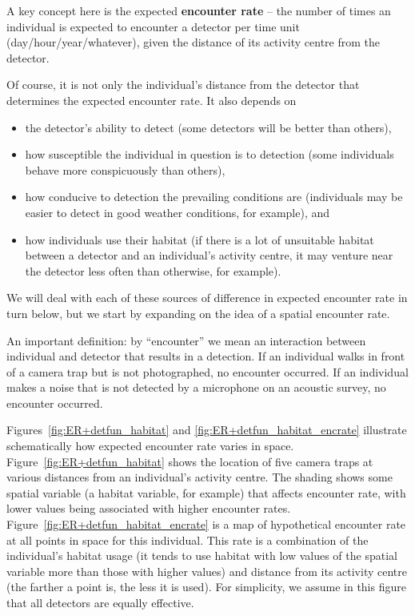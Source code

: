 \documentclass[graybox,envcountchap,sectrefs]{SpringerStyleFiles/styles/svmono}\usepackage[]{graphicx}\usepackage[]{color}
\begin{document}
A key concept here is the expected \textbf{encounter rate} -- the number of times an individual is expected to encounter a detector per time unit (day/hour/year/whatever), given the distance of its activity centre from the detector. %

Of course, it is not only the individual's distance from the detector that determines the expected encounter rate. It also depends on 
\begin{itemize}
\item the detector's ability to detect (some detectors will be better than others), 
\item how susceptible the individual in question is to detection (some individuals behave more conspicuously than others), 
\item how conducive to detection the prevailing conditions are (individuals may be easier to detect in good weather conditions, for example), and 
\item how individuals use their habitat (if there is a lot of unsuitable habitat between a detector and an individual's activity centre, it may venture near the detector less often than otherwise, for example).  
\end{itemize}

We will deal with each of these sources of difference in expected encounter rate in turn below, but we start by expanding on the idea of a spatial encounter rate.

An important definition: by ``encounter'' we mean an interaction between individual and detector that results in a detection. If an individual walks in front of a camera trap but is not photographed, no encounter occurred. If an individual makes a noise that is not detected by a microphone on an acoustic survey, no encounter occurred. 

Figures~\ref{fig:ER+detfun_habitat} and \ref{fig:ER+detfun_habitat_encrate} illustrate schematically how expected encounter rate varies in space. Figure~\ref{fig:ER+detfun_habitat} shows the location of five camera traps at various distances from an individual's activity centre. The shading shows some spatial variable (a habitat variable, for example) that affects encounter rate, with lower values being associated with higher encounter rates. Figure~\ref{fig:ER+detfun_habitat_encrate} is a map of hypothetical encounter rate at all points in space for this individual. This rate is a combination of the individual's habitat usage (it tends to use habitat with low values of the spatial variable more than those with higher values) and distance from its activity centre (the farther a point is, the less it is used). For simplicity, we assume in this figure that all detectors are equally effective.
\end{document}
